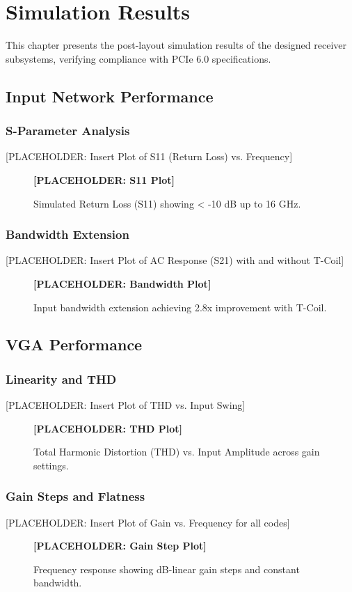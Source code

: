 \chapter{Simulation Results}
\label{Chapter5}

This chapter presents the post-layout simulation results of the designed receiver subsystems, verifying compliance with PCIe 6.0 specifications.

\section{Input Network Performance}
\subsection{S-Parameter Analysis}
[PLACEHOLDER: Insert Plot of S11 (Return Loss) vs. Frequency]
\begin{figure}[htbp]
    \centering
    \textbf{[PLACEHOLDER: S11 Plot]}
    \caption{Simulated Return Loss (S11) showing < -10 dB up to 16 GHz.}
\end{figure}

\subsection{Bandwidth Extension}
[PLACEHOLDER: Insert Plot of AC Response (S21) with and without T-Coil]
\begin{figure}[htbp]
    \centering
    \textbf{[PLACEHOLDER: Bandwidth Plot]}
    \caption{Input bandwidth extension achieving 2.8x improvement with T-Coil.}
\end{figure}

\section{VGA Performance}
\subsection{Linearity and THD}
[PLACEHOLDER: Insert Plot of THD vs. Input Swing]
\begin{figure}[htbp]
    \centering
    \textbf{[PLACEHOLDER: THD Plot]}
    \caption{Total Harmonic Distortion (THD) vs. Input Amplitude across gain settings.}
\end{figure}

\subsection{Gain Steps and Flatness}
[PLACEHOLDER: Insert Plot of Gain vs. Frequency for all codes]
\begin{figure}[htbp]
    \centering
    \textbf{[PLACEHOLDER: Gain Step Plot]}
    \caption{Frequency response showing dB-linear gain steps and constant bandwidth.}
\end{figure}

